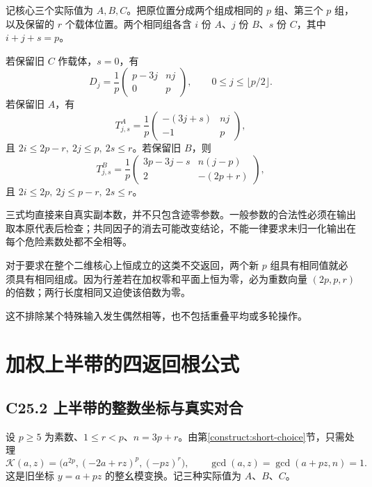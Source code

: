 {记核心三个实际值为} \(A,B,C\){。把原位置分成两个组成相同的} \(p\) {组、第三个} \(p\) {组，以及保留的} \(r\) {个载体位置。两个相同组各含} \(i\) {份} \(A\){、}\(j\) {份} \(B\){、}\(s\) {份} \(C\){，其中} \(i+j+s=p\){。}

{若保留旧} \(C\) {作载体，}\(s=0\){，有} \[
D_j=\frac1p\begin{pmatrix}p-3j&nj\\0&p\end{pmatrix},
\qquad 0\le j\le\lfloor p/2\rfloor.
\tag{C24.3}
\] {若保留旧} \(A\){，有} \[
T^A_{j,s}=\frac1p\begin{pmatrix}-(3j+s)&nj\\-1&p\end{pmatrix},
\tag{C24.4}
\] {且} \(2i\le2p-r,\ 2j\le p,\ 2s\le r\){。若保留旧} \(B\){，则} \[
T^B_{j,s}=\frac1p\begin{pmatrix}3p-3j-s&n(j-p)\\2&-(2p+r)\end{pmatrix},
\tag{C24.5}
\] {且} \(2i\le2p,\ 2j\le p-r,\ 2s\le r\){。}

{三式均直接来自真实副本数，并不只包含迹零参数。一般参数的合法性必须在输出取本原代表后检查；共同因子的消去可能改变结论，不能一律要求未归一化输出在每个危险素数处都不全相等。}

{对于要求在整个二维核心上恒成立的这类不交返回，两个新} \(p\) {组具有相同值就必须具有相同组成。因为行差若在加权零和平面上恒为零，必为重数向量} \((2p,p,r)\) {的倍数；两行长度相同又迫使该倍数为零。}

{这不排除某个特殊输入发生偶然相等，也不包括重叠平均或多轮操作。}


\section{加权上半带的四返回根公式}\label{construct:upper-four}
\subsection*{\texorpdfstring{{C25.2} {上半带的整数坐标与真实对合}}{C25.2 上半带的整数坐标与真实对合}}\label{C25-h155}

{设} {\ensuremath{p\ge 5}} {为素数、\ensuremath{1\le r<p}、\ensuremath{n=3p+r}。由}第\ref{construct:short-choice}节{，只需处理} \[
\mathcal K(a,z)=\bigl(a^{2p},(-2a+rz)^p,(-pz)^r\bigr),
\qquad \gcd(a,z)=\gcd(a+pz,n)=1.
\tag{C25.1}
\] {这是旧坐标} {\ensuremath{y=a+pz}} {的整幺模变换。记三种实际值为} {\ensuremath{A}、\ensuremath{B}、\ensuremath{C}。}

